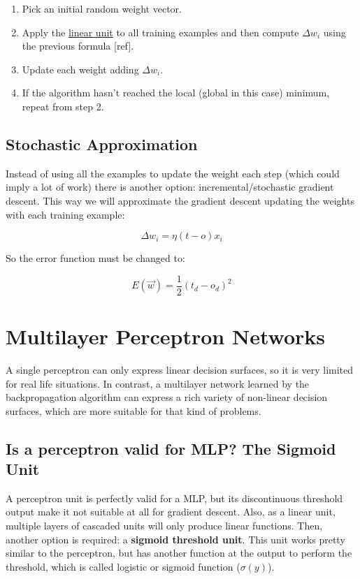 	\begin{enumerate}

		\item Pick an initial random weight vector.
		\item Apply the \hyperref[linear_unit]{linear unit} to all training examples and then compute $\Delta w_i$  using the previous formula [ref].
		\item Update each weight adding $\Delta w_i$.
		\item If the algorithm hasn’t reached the local (global in this case) minimum, repeat from step 2.
	
	\end{enumerate}

	\subsection{Stochastic Approximation}
	Instead of using all the examples to update the weight each step (which could imply a lot of work) there is another option: incremental/stochastic gradient descent. This way we will approximate the gradient descent updating the weights with each training example:

	\begin{equation}
		\label{delta_rule}
		\Delta w_{i}= \eta (t - o) x_{i}
	\end{equation}

	So the error function must be changed to:

	\begin{equation}
		\label{error_function_stoc_square}
		E(\vec{w}) = \frac{1}{2} (t_d-o_d)^2 
	\end{equation}

\section{Multilayer Perceptron Networks}
A single perceptron can only express linear decision surfaces, so it is very limited for real life situations.  In contrast, a multilayer network learned by the backpropagation algorithm can express a rich variety of non-linear decision surfaces, which are more suitable for that kind of problems.

	\subsection{Is a perceptron valid for MLP? The Sigmoid Unit}
	A perceptron unit is perfectly valid for a MLP, but its discontinuous threshold output make it not suitable at all for gradient descent. Also, as a linear unit, multiple layers of cascaded units will only produce linear functions. Then, another option is required: a \textbf{sigmoid threshold unit}. This unit works pretty similar to the perceptron, but has another function at the output to perform the threshold, which is called logistic or sigmoid function ($\sigma(y)$).


